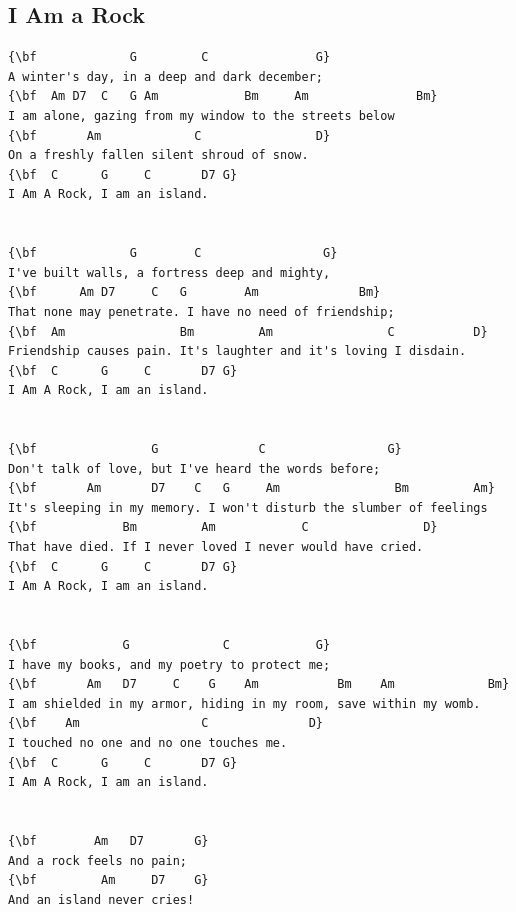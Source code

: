\documentclass[a4paper]{article}
\begin{document}
\subsection{I Am a Rock}
\begin{Verbatim}[commandchars=\\\{\}]
{\bf             G         C               G}
A winter's day, in a deep and dark december;
{\bf  Am D7  C   G Am            Bm     Am               Bm}
I am alone, gazing from my window to the streets below
{\bf       Am             C                D}
On a freshly fallen silent shroud of snow.
{\bf  C      G     C       D7 G}
I Am A Rock, I am an island.


{\bf             G        C                 G}
I've built walls, a fortress deep and mighty,
{\bf      Am D7     C   G        Am              Bm}
That none may penetrate. I have no need of friendship;
{\bf  Am                Bm         Am                C           D}
Friendship causes pain. It's laughter and it's loving I disdain.
{\bf  C      G     C       D7 G}
I Am A Rock, I am an island.


{\bf                G              C                 G}
Don't talk of love, but I've heard the words before;
{\bf       Am       D7    C   G     Am                Bm         Am}
It's sleeping in my memory. I won't disturb the slumber of feelings
{\bf            Bm         Am            C                D}
That have died. If I never loved I never would have cried.
{\bf  C      G     C       D7 G}
I Am A Rock, I am an island.


{\bf            G             C            G}
I have my books, and my poetry to protect me;
{\bf       Am   D7     C    G    Am           Bm    Am             Bm}
I am shielded in my armor, hiding in my room, save within my womb.
{\bf    Am                 C              D}
I touched no one and no one touches me.
{\bf  C      G     C       D7 G}
I Am A Rock, I am an island.


{\bf        Am   D7       G}
And a rock feels no pain;
{\bf         Am     D7    G}
And an island never cries!

\end{Verbatim}
\newpage
\end{document}
